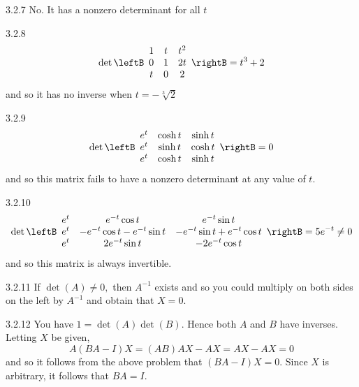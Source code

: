 \begin{Answer}{3.2.7}
 No. It has a nonzero determinant for all $t$
\end{Answer}
\begin{Answer}{3.2.8}
\[
\det \leftB
\begin{array}{ccc}
1 & t & t^{2} \\
0 & 1 & 2t \\
t & 0 & 2
\end{array}
\rightB = t^{3}+2
\]
and so it has no inverse when $t=-\sqrt[3]{2}$
\end{Answer}
\begin{Answer}{3.2.9}
\[
\det \leftB
\begin{array}{ccc}
e^{t} & \cosh t & \sinh t \\
e^{t} & \sinh t & \cosh t \\
e^{t} & \cosh t & \sinh t
\end{array}
\rightB = 0
\]
and so this matrix fails to have a nonzero determinant at any value of $t$.
\end{Answer}
\begin{Answer}{3.2.10}
\[
\det \leftB
\begin{array}{ccc}
e^{t} & e^{-t}\cos t & e^{-t}\sin t \\
e^{t} & -e^{-t}\cos t-e^{-t}\sin t & -e^{-t}\sin t+e^{-t}\cos t \\
e^{t} & 2e^{-t}\sin t & -2e^{-t}\cos t%
\end{array}
\rightB = 5e^{-t} \neq 0
\]
and so this matrix is always invertible.
\end{Answer}
\begin{Answer}{3.2.11}
If $\det \left( A\right) \neq 0,$ then $A^{-1}$ exists and so you could
multiply on both sides on the left by $A^{-1}$ and obtain that $X=0$.
\end{Answer}
\begin{Answer}{3.2.12}
You have $1=\det \left( A\right) \det \left( B\right) $.
Hence both $A$ and $B$ have inverses. Letting $X$ be given,
\[
A\left( BA-I\right) X=\left( AB\right) AX-AX=AX-AX = 0
\]
and so it follows from the above problem that $\left( BA-I\right)X=0.$ Since $X$ is arbitrary, it follows that $BA=I.$
\end{Answer}
